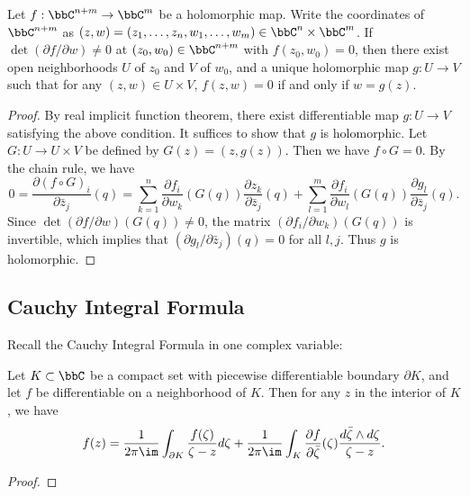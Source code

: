 \begin{theorem}\label{thm:holomorphic_implicit_function_theorem}
	Let \(f: \bbC^{n+m} \to \bbC^m\) be a holomorphic map.
	Write the coordinates of \(\bbC^{n+m}\) as \((z,w) = (z_1, \ldots, z_n, w_1, \ldots, w_m) \in \bbC^n \times \bbC^m\).
	If \(\det(\partial f/\partial w) \neq 0\) at \((z_0, w_0) \in \bbC^{n+m}\) with \(f(z_0, w_0) = 0\),
	then there exist open neighborhoods \(U\) of \(z_0\) and \(V\) of \(w_0\), and a unique holomorphic map \(g: U \to V\) such that for any \((z, w) \in U \times V\), \(f(z, w) = 0\) if and only if \(w = g(z)\).
\end{theorem}
\begin{proof}
	By real implicit function theorem, there exist differentiable map \(g:U \to V\) satisfying the above condition.
	It suffices to show that \(g\) is holomorphic.
	Let \(G: U \to U \times V\) be defined by \(G(z) = (z, g(z))\).
	Then we have \(f \circ G = 0\).
	By the chain rule, we have
	\[ 0 = \frac{\partial (f\circ G)_i}{\partial \bar{z}_j}(q) = \sum_{k=1}^n \frac{\partial f_i}{\partial w_k}(G(q)) \frac{\partial z_k}{\partial \bar{z}_j}(q) + \sum_{l=1}^m \frac{\partial f_i}{\partial w_l}(G(q)) \frac{\partial g_l}{\partial \bar{z}_j}(q). \]
	Since \(\det(\partial f/\partial w)(G(q)) \neq 0\), the matrix \((\partial f_i/\partial w_k)(G(q))\) is invertible, which implies that \((\partial g_l/\partial \bar{z}_j)(q) = 0\) for all \(l,j\).
	Thus \(g\) is holomorphic.
\end{proof}

\subsection{Cauchy Integral Formula}

Recall the Cauchy Integral Formula in one complex variable:

\begin{theorem}\label{thm:Cauchy_Integral_Formula_in_one_complex_variable}
	Let \(K \subset \bbC\) be a compact set with piecewise differentiable boundary \(\partial K\), and let \(f\) be differentiable on a neighborhood of \(K\).
	Then for any \(z\) in the interior of \(K\), we have
	\[ f(z) = \frac{1}{2\pi \im } \int_{\partial K} \frac{f(\zeta)}{\zeta - z} d\zeta + \frac{1}{2\pi \im} \int_K \frac{\partial f}{\partial \bar{\zeta}}(\zeta) \frac{d\bar{\zeta} \wedge d\zeta}{\zeta - z}. \]
\end{theorem}
\begin{proof}
\end{proof}

